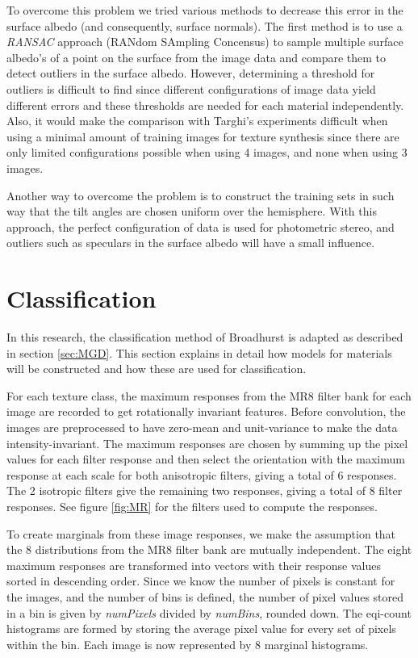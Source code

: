 To overcome this problem we tried various methods to decrease this error in the surface albedo (and consequently, surface normals). The first method is to use a {\it RANSAC} approach (RANdom SAmpling Concensus) to sample multiple surface albedo's of a point on the surface from the image data and compare them to detect outliers in the surface albedo. However, determining a threshold for outliers is difficult to find since different configurations of image data yield different errors and these thresholds are needed for each material independently. Also, it would make the comparison with Targhi's experiments difficult when using a minimal amount of training images for texture synthesis since there are only limited configurations possible when using 4 images, and none when using 3 images. 

Another way to overcome the problem is to construct the training sets in such way that the tilt angles are chosen uniform over the hemisphere. With this approach, the perfect configuration of data is used for photometric stereo, and outliers such as speculars in the surface albedo will have a small influence.

\section{Classification}\label{sec:Classification}

In this research, the classification method of Broadhurst is adapted as described in section \ref{sec:MGD}. This section explains in detail how models for materials will be constructed and how these are used for classification.

For each texture class, the maximum responses from the MR8 filter bank for each image are recorded to get rotationally invariant features. Before convolution, the images are preprocessed to have zero-mean and unit-variance to make the data intensity-invariant. The maximum responses are chosen by summing up the pixel values for each filter response and then select the orientation with the maximum response at each scale for both anisotropic filters, giving a total of 6 responses. The 2 isotropic filters give the remaining two responses, giving a total of 8 filter responses. See figure \ref{fig:MR} for the filters used to compute the responses.

To create marginals from these image responses, we make the assumption that the 8 distributions from the MR8 filter bank are mutually independent. The eight maximum responses are transformed into vectors with their response values sorted in descending order. Since we know the number of pixels is constant for the images, and the number of bins is defined, the number of pixel values stored in a bin is given by {\it numPixels} divided by {\it numBins}, rounded down. The eqi-count histograms are formed by storing the average pixel value for every set of pixels within the bin. Each image is now represented by 8 marginal histograms.

